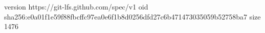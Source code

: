 version https://git-lfs.github.com/spec/v1
oid sha256:e0a01f1e59f88fbcffc97ea0e6f1b8d0256dfd27c6b471473035059b52758ba7
size 1476

